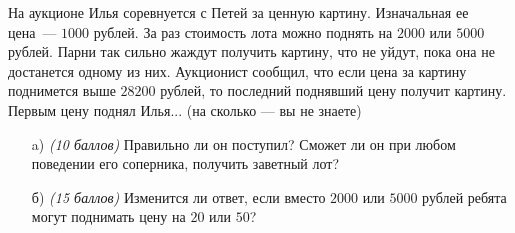 
На аукционе Илья соревнуется с Петей за ценную картину.
	Изначальная ее цена~--- $1000$ рублей. За раз стоимость лота
	можно поднять на $2000$ или $5000$ рублей. Парни так сильно 
	жаждут получить картину, что не уйдут, пока она не достанется 
	одному из них. Аукционист сообщил, что если цена за картину
	поднимется выше $28200$ рублей, то последний поднявший цену
	получит картину. Первым цену поднял Илья... (на сколько ---
	вы не знаете)
    
    \begin{enumerate}
        \item[a)] \textit{(10 баллов)} Правильно ли он поступил? Сможет ли он при любом 
    поведении его соперника, получить заветный лот?
        \item[б)] \textit{(15 баллов)} Изменится ли ответ, если вместо $2000$ или $5000$ рублей ребята могут
    поднимать цену на $20$ или $50$?
    
    \end{enumerate}